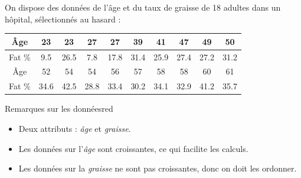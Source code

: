 \documentclass{article}
\begin{document}
On dispose des données de l'âge et du taux de graisse de 18 adultes dans un hôpital, sélectionnés au hasard :

\vspace{0.25cm}

\begin{center}
\begin{tabular}{ |c|c|c|c|c|c|c|c|c|c|} 
    \hline
    Âge & 23 & 23 & 27 & 27 & 39 & 41 &47 &49 & 50\\
    \hline
    Fat \% & 9.5 & 26.5 & 7.8 & 17.8 & 31.4 & 25.9 & 27.4 & 27.2 & 31.2 \\
    \hline
    Âge & 52 & 54 & 54 & 56 & 57 & 58 & 58 & 60 & 61\\
    \hline
    Fat \% & 34.6 & 42.5 & 28.8 & 33.4 & 30.2 & 34.1 & 32.9 & 41.2 & 35.7 \\
    \hline

\end{tabular}
\end{center}


\begin{prettyBox}{Remarques sur les données}{red}
\begin{itemize}
    \item Deux attributs : \textit{âge} et \textit{graisse}.
    \item Les données sur l'\textit{âge} sont croissantes, ce qui facilite les calculs.
    \item Les données sur la \textit{graisse} ne sont pas croissantes, donc on doit les ordonner.
\end{itemize}
\end{prettyBox}

\vspace{0.25cm}
\end{document}
